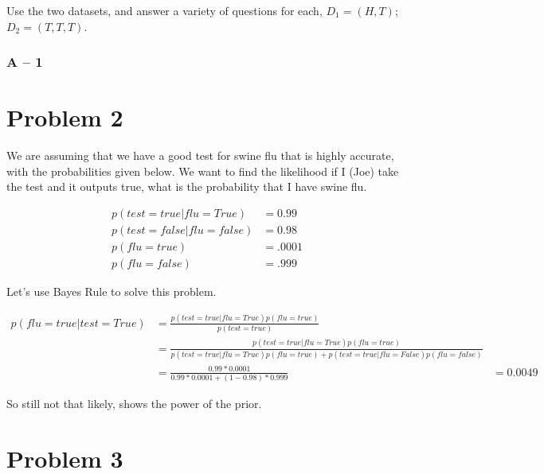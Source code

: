 \documentclass[paper=a4, fontsize=11pt]{scrartcl} %
\begin{document}
Use the two datasets, and answer a variety of questions for each, $D_1 = (H,T)$; $D_2 = (T,T,T)$.

\subsubsection{A -- 1}

 

\section{Problem 2}
We are assuming that we have a good test for swine flu that is highly accurate, with the probabilities given below.  
We want to find the likelihood if I (Joe) take the test and it outputs true, what is the probability that I have swine flu.

\begin{align}
p(test=true|flu=True) &= 0.99 \\
p(test=false|flu=false) &= 0.98 \\
p(flu=true) &= .0001 \\
p(flu=false) &= .999
\end{align}

Let's use Bayes Rule to solve this problem.

\begin{align}
p(flu=true|test=True) &= \frac{p(test=true|flu=True) p(flu=true)}{p(test=true)} \\
&=  \frac{p(test=true|flu=True) p(flu=true)}{p(test=true|flu=True) p(flu=true) + p(test=true|flu=False) p(flu=false)} \\
&= \frac{0.99*0.0001}{0.99*0.0001+(1-0.98)*0.999}
&= 0.0049
\end{align}

So still not that likely, shows the power of the prior.

\section{Problem 3}


\end{document}
